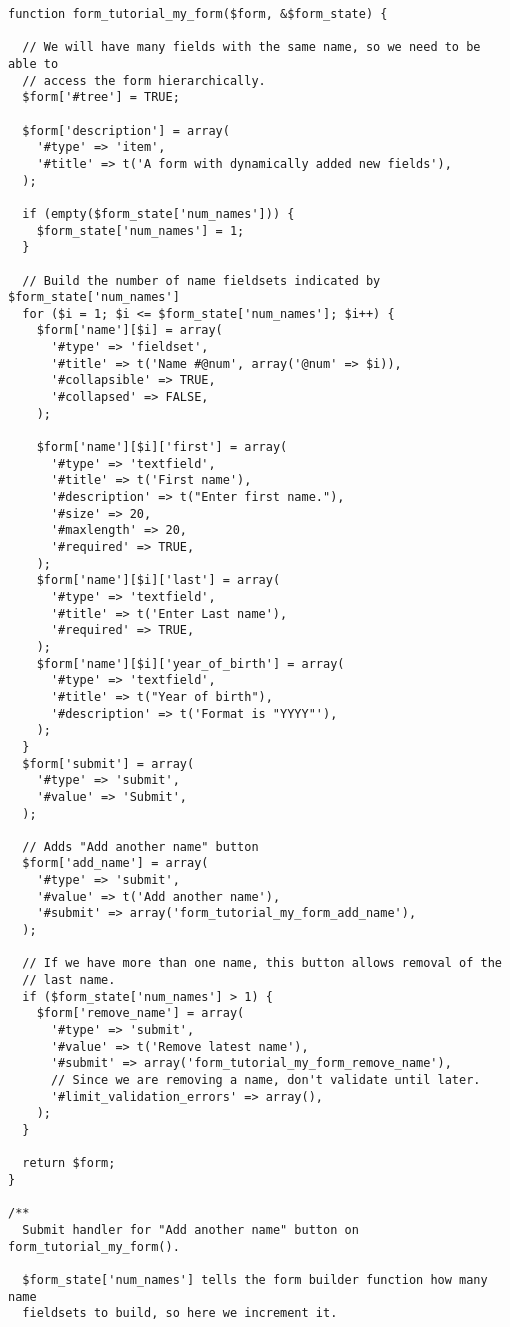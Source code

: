 \documentclass[11pt]{article}
\begin{document}
\begin{verbatim}
function form_tutorial_my_form($form, &$form_state) {

  // We will have many fields with the same name, so we need to be able to
  // access the form hierarchically.
  $form['#tree'] = TRUE;

  $form['description'] = array(
    '#type' => 'item',
    '#title' => t('A form with dynamically added new fields'),
  );

  if (empty($form_state['num_names'])) {
    $form_state['num_names'] = 1;
  }

  // Build the number of name fieldsets indicated by $form_state['num_names']
  for ($i = 1; $i <= $form_state['num_names']; $i++) {
    $form['name'][$i] = array(
      '#type' => 'fieldset',
      '#title' => t('Name #@num', array('@num' => $i)),
      '#collapsible' => TRUE,
      '#collapsed' => FALSE,
    );

    $form['name'][$i]['first'] = array(
      '#type' => 'textfield',
      '#title' => t('First name'),
      '#description' => t("Enter first name."),
      '#size' => 20,
      '#maxlength' => 20,
      '#required' => TRUE,
    );
    $form['name'][$i]['last'] = array(
      '#type' => 'textfield',
      '#title' => t('Enter Last name'),
      '#required' => TRUE,
    );
    $form['name'][$i]['year_of_birth'] = array(
      '#type' => 'textfield',
      '#title' => t("Year of birth"),
      '#description' => t('Format is "YYYY"'),
    );
  }
  $form['submit'] = array(
    '#type' => 'submit',
    '#value' => 'Submit',
  );

  // Adds "Add another name" button
  $form['add_name'] = array(
    '#type' => 'submit',
    '#value' => t('Add another name'),
    '#submit' => array('form_tutorial_my_form_add_name'),
  );

  // If we have more than one name, this button allows removal of the
  // last name.
  if ($form_state['num_names'] > 1) {
    $form['remove_name'] = array(
      '#type' => 'submit',
      '#value' => t('Remove latest name'),
      '#submit' => array('form_tutorial_my_form_remove_name'),
      // Since we are removing a name, don't validate until later.
      '#limit_validation_errors' => array(),
    );
  }

  return $form;
}

/**
  Submit handler for "Add another name" button on form_tutorial_my_form().
 
  $form_state['num_names'] tells the form builder function how many name
  fieldsets to build, so here we increment it.
 

\end{verbatim}
\end{document}
